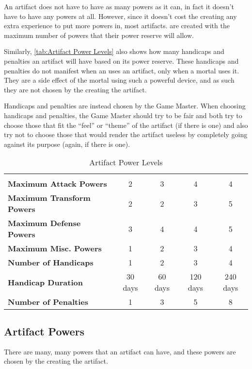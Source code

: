 \begin{multicols*}{2}
An artifact does not have to have as many powers as it can, in fact it doesn’t have to have any powers at all. However, since it doesn’t cost the creating  any extra experience to put more powers in, most artifacts. are created with the maximum number of powers that their power reserve will allow.

Similarly, \autoref*{tab:Artifact Power Levels} also shows how many handicaps and penalties an artifact will have based on its power reserve. These handicaps and penalties do not manifest when an  uses an artifact, only when a mortal uses it. They are a side effect of the mortal using such a powerful device, and as such they are not chosen by the  creating the artifact.

Handicaps and penalties are instead chosen by the Game Master. When choosing handicaps and penalties, the Game Master should try to be fair and both try to choose those that fit the “feel” or “theme” of the artifact (if there is one) and also try not to choose those that would render the artifact useless by completely going against its purpose (again, if there is one).

\begin {table}[H]
  \caption{Artifact Power Levels}\label{tab:Artifact Power Levels}
  \begin{tabularx}{\columnwidth}{>{\bfseries}Ycccc}
	 &  &  &  & \\
	Maximum Attack Powers & 2 & 3 & 4 & 4\\
	Maximum Transform Powers & 2 & 2 & 3 & 5\\
	Maximum Defense Powers & 3 & 4 & 4 & 5\\
	Maximum Misc. Powers & 1 & 2 & 3 & 4\\
	Number of Handicaps & 1 & 2 & 3 & 4\\
	Handicap Duration & 30 days & 60 days & 120 days & 240 days\\
	Number of Penalties & 1 & 3 & 5 & 8
  \end {tabularx}
\end {table}

\subsection{Artifact Powers}
There are many, many powers that an artifact can have, and these powers are chosen by the  creating the artifact.


\end{multicols*}

